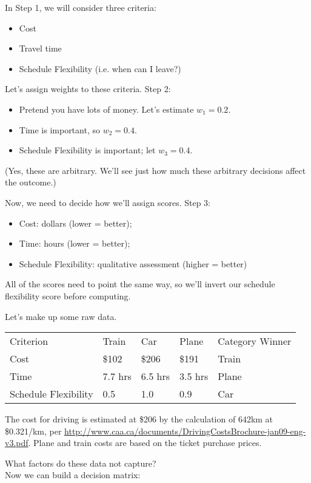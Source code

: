 In Step 1, we will consider three criteria:
\begin{itemize}
\item Cost
\item Travel time
\item Schedule Flexibility (i.e. when can I leave?)
\end{itemize}
Let's assign weights to these criteria. Step 2:
\begin{itemize}
\item Pretend you have lots of money. Let's estimate $w_1 = 0.2$.
\item Time is important, so $w_2 = 0.4$.
\item Schedule Flexibility is important; let $w_3 = 0.4$.
\end{itemize}
(Yes, these are arbitrary. We'll see just how much these arbitrary
decisions affect the outcome.)

Now, we need to decide how we'll assign scores. Step 3:
\begin{itemize}
\item Cost: dollars (lower = better);
\item Time: hours (lower = better);
\item Schedule Flexibility: qualitative assessment (higher = better)
\end{itemize}
All of the scores need to point the same way, so we'll invert our
schedule flexibility score before computing.

Let's make up some raw data.

\begin{center}
\begin{tabular}{lllll}
Criterion & Train & Car & Plane & Category Winner \\
Cost & \$102 & \$206 & \$191 & Train \\
Time & 7.7 hrs & 6.5 hrs & 3.5 hrs & Plane \\
Schedule Flexibility & 0.5 & 1.0 & 0.9 & Car
\end{tabular}
\end{center}

The cost for driving is estimated at \$206 by the calculation of 642km at \$0.321/km, per \url{http://www.caa.ca/documents/DrivingCostsBrochure-jan09-eng-v3.pdf}. Plane and train costs are based on the ticket purchase prices.

\newpage
{\sf What factors do these data not capture?}\\[2em]

Now we can build a decision matrix:

